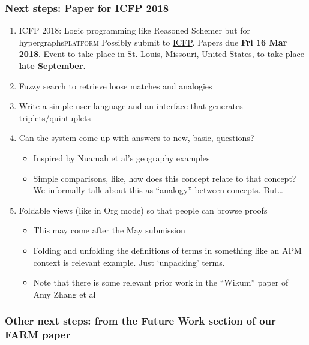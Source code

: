 \documentclass[11pt]{article}
\begin{document}
\subsubsection{Next steps: Paper for ICFP 2018}
\label{sec:org9f90854}
\begin{enumerate}
\item ICFP 2018: Logic programming like Reasoned Schemer but for hypergraphs\hfill{}\textsc{platform}
\label{sec:orgf154614}
Possibly submit to \href{http://conf.researchr.org/home/icfp-2018}{ICFP}. Papers due \textbf{Fri 16 Mar 2018}.
Event to take place in St. Louis, Missouri, United States, to take place \textbf{late September}.
\item Fuzzy search to retrieve loose matches and analogies
\label{sec:orgd84d9ae}
\item Write a simple user language and an interface that generates triplets/quintuplets
\label{sec:orgaeffe19}
\item Can the system come up with answers to new, basic, questions?
\label{sec:org09f2bf6}

\begin{itemize}
\item Inspired by Nuamah et al's geography examples
\item Simple comparisons, like, how does this concept relate to that concept?  We informally talk about this as ``analogy'' between concepts.  But\ldots{}
\end{itemize}

\item Foldable views (like in Org mode) so that people can browse proofs
\label{sec:org606cfd2}

\begin{itemize}
\item This may come after the May submission
\item Folding and unfolding the definitions of terms in something like an APM context is relevant example.  Just `unpacking' terms.
\item Note that there is some relevant prior work in the ``Wikum'' paper of Amy Zhang et al
\end{itemize}
\end{enumerate}

\subsubsection{Other next steps: from the Future Work section of our FARM paper}
\label{sec:org0456e64}
\end{document}
